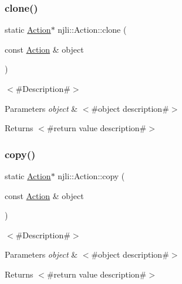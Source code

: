 \mbox{\label{classnjli_1_1_action_ae07d8cc55040de9a55fe4db2bf530796}} 
\subsubsection{\texorpdfstring{clone()}{clone()}}
{\footnotesize\ttfamily static \mbox{\hyperlink{classnjli_1_1_action}{Action}}$\ast$ njli\+::\+Action\+::clone (\begin{DoxyParamCaption}\item[{const \mbox{\hyperlink{classnjli_1_1_action}{Action}} \&}]{object }\end{DoxyParamCaption})\hspace{0.3cm}{\ttfamily [static]}}

$<$\#\+Description\#$>$


\begin{DoxyParams}{Parameters}
{\em object} & $<$\#object description\#$>$\\
\hline
\end{DoxyParams}
\begin{DoxyReturn}{Returns}
$<$\#return value description\#$>$ 
\end{DoxyReturn}
\mbox{\label{classnjli_1_1_action_a3c461aaa03e81dfc294720d0c543a2de}} 
\subsubsection{\texorpdfstring{copy()}{copy()}}
{\footnotesize\ttfamily static \mbox{\hyperlink{classnjli_1_1_action}{Action}}$\ast$ njli\+::\+Action\+::copy (\begin{DoxyParamCaption}\item[{const \mbox{\hyperlink{classnjli_1_1_action}{Action}} \&}]{object }\end{DoxyParamCaption})\hspace{0.3cm}{\ttfamily [static]}}

$<$\#\+Description\#$>$


\begin{DoxyParams}{Parameters}
{\em object} & $<$\#object description\#$>$\\
\hline
\end{DoxyParams}
\begin{DoxyReturn}{Returns}
$<$\#return value description\#$>$ 
\end{DoxyReturn}
\mbox{\label{classnjli_1_1_action_a83a8876ae63b92804004cf3febe76573}} 
